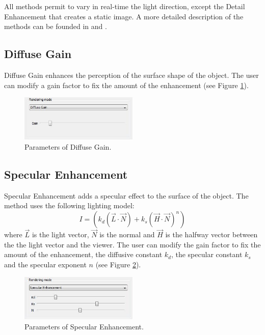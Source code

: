 \documentclass[oneside, 11pt]{book}
\begin{document}
All methods permit to vary in real-time the light direction, except the Detail Enhancement that creates a static image. A more detailed description of the methods can be founded in \cite{ptm} and \cite{enhancement}.

\subsection{Diffuse Gain}
Diffuse Gain enhances the perception of the surface shape of the object. The user can modify a gain factor to fix the amount of the enhancement (see Figure \ref{fig:diffuseGain}).

\begin{figure}[hbt]
  \centering
  \includegraphics[width=0.5\textwidth]{diffuse_gain}
  \caption{Parameters of Diffuse Gain.}
  \label{fig:diffuseGain}
\end{figure}

\subsection{Specular Enhancement}
Specular Enhancement adds a specular effect to the surface of the object. The method uses the following lighting model:
\begin{equation}
    I = (k_{d} (\vec{L} \cdot \vec{N}) + k_{s} (\vec{H} \cdot \vec{N})^{n})
\end{equation}
where $\vec{L}$ is the light vector, $\vec{N}$ is the normal and $\vec{H}$ is the halfway vector between the the light vector and the viewer. The user can modify the gain factor to fix the amount of the enhancement, the diffusive constant $k_{d}$, the specular constant $k_{s}$ and the specular exponent $n$ (see Figure \ref{fig:specularEnh}).

\begin{figure}[hbt]
  \centering
  \includegraphics[width=0.5\textwidth]{specular_enh}
  \caption{Parameters of Specular Enhancement.}
  \label{fig:specularEnh}
\end{figure}
\end{document}
